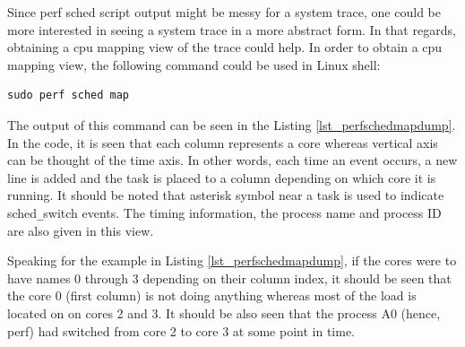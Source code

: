 \begin{itemize}
	
	
	Since perf sched script output might be messy for a system trace, one could be more interested in seeing a system trace in a more abstract form. In that regards, obtaining a cpu mapping view of the trace could help. In order to obtain a cpu mapping view, the following command could be used in Linux shell:
	\begin{lstlisting}[style=bash]
		sudo perf sched map
	\end{lstlisting}
	The output of this command can be seen in the Listing \ref{lst_perfschedmapdump}. In the code, it is seen that each column represents a core whereas vertical axis can be thought of the time axis. In other words, each time an event occurs, a new line is added and the task is placed to a column depending on which core it is running. It should be noted that asterisk symbol near a task is used to indicate sched\texttt{\_}switch events. The timing information, the process name and process ID are also given in this view. 
	
	Speaking for the example in Listing \ref{lst_perfschedmapdump}, if the cores were to have names 0 through 3 depending on their column index, it should be seen that the core 0 (first column) is not doing anything whereas most of the load is located on on cores 2 and 3. It should be also seen that the process A0 (hence, perf) had switched from core 2 to core 3 at some point in time.
	

\end{itemize}
